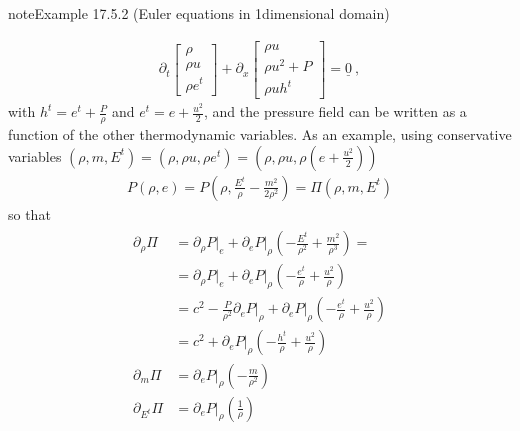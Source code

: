 \documentclass[letterpaper,10pt,english]{jupyterBook}
\begin{document}
\begin{sphinxadmonition}{note}{Example 17.5.2 (Euler equations in 1\sphinxhyphen{}dimensional domain)}



\sphinxAtStartPar
{}
\begin{equation*}
\begin{split}\partial_t \begin{bmatrix} \rho \\ \rho u \\ \rho e^t \end{bmatrix} + \partial_x \begin{bmatrix} \rho u \\ \rho u^2 + P \\ \rho u h^t  \end{bmatrix} = \underline{0} \ ,\end{split}
\end{equation*}
\sphinxAtStartPar
with \(h^t = e^t + \frac{P}{\rho}\) and \(e^t = e + \frac{u^2}{2}\), and the pressure field can be written as a function of the other thermodynamic variables. As an example, using conservative variables \((\rho, m, E^t) = (\rho, \rho u, \rho e^t) = \left(\rho, \rho u, \rho \left(e + \frac{u^2}{2}\right) \right)\)
\begin{equation*}
\begin{split}P(\rho, e) = P\left(\rho, \frac{E^t}{\rho} - \frac{m^2}{2 \rho^2}\right) = \Pi\left( \rho, m, E^t \right)\end{split}
\end{equation*}
\sphinxAtStartPar
so that
\begin{equation*}
\begin{split}\begin{aligned}
 \partial_{\rho} \Pi
  & = \partial_\rho P \big|_e + \partial_e P \big|_\rho \left( -\frac{E^t}{\rho^2} + \frac{m^2}{\rho^3} \right) = \\
  & = \partial_\rho P \big|_e + \partial_e P \big|_\rho \left( - \frac{e^t}{\rho} + \frac{u^2}{\rho} \right) \\
  & = c^2 - \frac{P}{\rho^2} \partial_e P \big|_\rho + \partial_e P \big|_\rho \left( - \frac{e^t}{\rho} + \frac{u^2}{\rho} \right) \\
  & = c^2 + \partial_e P \big|_\rho \left( - \frac{h^t}{\rho} + \frac{u^2}{\rho} \right) \\
 \partial_{m   } \Pi & = \partial_e P \big|_\rho \left( - \frac{m}{\rho^2}  \right) \\
 \partial_{E^t } \Pi & = \partial_e P \big|_\rho \left( \frac{1}{\rho} \right) \\
\end{aligned}\end{split}
\end{equation*}



\end{sphinxadmonition}
\end{document}
